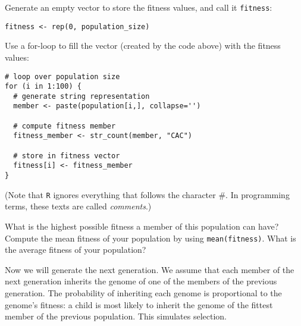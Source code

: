 \documentclass[a4paper, 9pt]{article}
\begin{document}
\begin{exercise}
    \action Generate an empty vector to store the fitness values, and call it \texttt{fitness}:
    \begin{lstlisting}
fitness <- rep(0, population_size)
    \end{lstlisting}
    \action Use a for-loop to fill the vector (created by the code above) with the fitness values:
    \begin{lstlisting}
# loop over population size
for (i in 1:100) {      
  # generate string representation
  member <- paste(population[i,], collapse='') 
  
  # compute fitness member   
  fitness_member <- str_count(member, "CAC")   
  
  # store in fitness vector
  fitness[i] <- fitness_member
}
\end{lstlisting}
    
    (Note that \texttt{R} ignores everything that follows the character \#. In programming terms, these texts are called \textit{comments}.)
    
    What is the highest possible fitness a member of this population can have?
    \action Compute the mean fitness of your population by using \verb|mean(fitness)|.
    What is the average fitness of your population?
\end{exercise}


Now we will generate the next generation. We assume that each member of
the next generation inherits the genome of one of the members of the
previous generation. The probability of inheriting each genome is
proportional to the genome's fitness: a child is most likely to inherit
the genome of the fittest member of the previous population. This
simulates selection.
\end{document}
